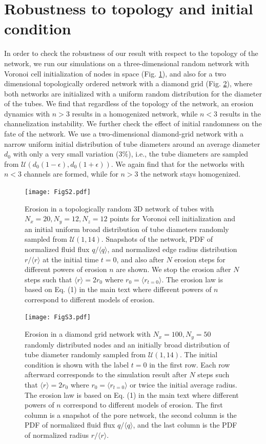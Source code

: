 \documentclass[%
 amsmath,amssymb,
prstper,
]{revtex4-2}
\begin{document}
\newpage
\section{Robustness to topology and initial condition}
% 
In order to check the robustness of our result with respect to the topology of the network, we run our simulations on a three-dimensional random network with Voronoi cell initialization of nodes in space (Fig. \ref{SIfig:fig2-3d}), and also for a two dimensional topologically ordered network with a diamond grid (Fig. \ref{fig:fig2-diamond}), where  both networks are initialized with a uniform random distribution for the diameter of the tubes. We find that regardless of the topology of the network, an erosion dynamics with $n>3$ results in a homogenized network, while $n<3$ results in the channelization instability. We further check the effect of initial randomness on the fate of the network. We use a two-dimensional diamond-grid network with a narrow uniform initial distribution of tube diameters around an average diameter $d_0$ with only a very small variation ($3\%$), i.e., the tube diameters are sampled from $\mathcal{U}(d_0(1-\epsilon), d_0(1+\epsilon))$. We again find that for the networks with $n<3$ channels are formed, while for $n>3$ the network stays homogenized.  
%
\begin{figure}[htp]
      \texttt{[image: FigS2.pdf]}
     \caption{Erosion in a topologically random 3D network of tubes with $N_x=20, N_y=12, N_z=12$ points for Voronoi cell initialization and an initial uniform broad distribution of tube diameters randomly sampled from $\mathcal{U}(1,14)$. Snapshots of the network, PDF of normalized fluid flux $q/\langle q \rangle$, and normalized edge radius distribution $r/\langle r \rangle$ at the initial time $t=0$, and also after $N$ erosion steps for different powers of erosion $n$ are shown. We stop the erosion after $N$ steps such that $\langle r\rangle=2r_0$ where $r_0 = \langle r_{t=0}\rangle$. The erosion law is based on Eq. (1) in the main text where different powers of $n$ correspond to different models of erosion.}\label{SIfig:fig2-3d}
 \end{figure}
%
\begin{figure}[htp]
 \texttt{[image: FigS3.pdf]} %
     \caption{Erosion in a diamond grid network with $N_x=100, N_y=50$ randomly distributed nodes and an initially broad  distribution of tube diameter randomly sampled from $\mathcal{U}(1,14)$. The initial condition is shown with the label $t=0$ in the first row. Each row afterward corresponds to the simulation result after $N$ steps such that $\langle r\rangle=2r_0$ where $r_0 = \langle r_{t=0}\rangle$ or twice the initial average radius. The erosion law is based on Eq. (1) in the main text where different powers of $n$ correspond to different models of erosion. The first column is a snapshot of the pore network, the second column is the PDF of normalized fluid flux $q/\langle q \rangle$, and the last column is the PDF of normalized radius $r/\langle r\rangle$.}\label{fig:fig2-diamond}%
\end{figure}
\end{document}
